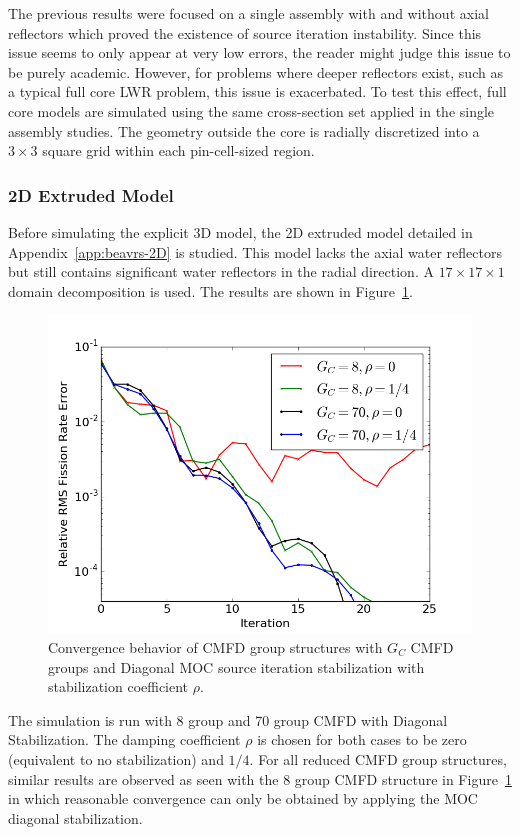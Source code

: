 The previous results were focused on a single assembly with and without axial reflectors which proved the existence of source iteration instability. Since this issue seems to only appear at very low errors, the reader might judge this issue to be purely academic. However, for problems where deeper reflectors exist, such as a typical full core \ac{LWR} problem, this issue is exacerbated. To test this effect, full core models are simulated using the same cross-section set applied in the single assembly studies. The geometry outside the core is radially discretized into a $3 \times 3$ square grid within each pin-cell-sized region.

\subsubsection{2D Extruded Model}

Before simulating the explicit 3D model, the 2D extruded model detailed in Appendix~\ref{app:beavrs-2D} is studied. This model lacks the axial water reflectors but still contains significant water reflectors in the radial direction. A $17 \times 17 \times 1$ domain decomposition is used. The results are shown in Figure~\ref{fig:fc-2D}. 
\begin{figure}[ht!]
	\centering
	\includegraphics[width=0.71\linewidth]{figures/convergence/fc_2D.png}
	\caption{Convergence behavior of \ac{CMFD} group structures with $G_C$ \ac{CMFD} groups and Diagonal \ac{MOC} source iteration stabilization with stabilization coefficient $\rho$.}
	\label{fig:fc-2D}
\end{figure}
The simulation is run with 8 group and 70 group \ac{CMFD} with Diagonal Stabilization. The damping coefficient $\rho$ is chosen for both cases to be zero (equivalent to no stabilization) and $1/4$. For all reduced \ac{CMFD} group structures, similar results are observed as seen with the 8 group \ac{CMFD} structure in Figure~\ref{fig:fc-2D} in which reasonable convergence can only be obtained by applying the \ac{MOC} diagonal stabilization.

